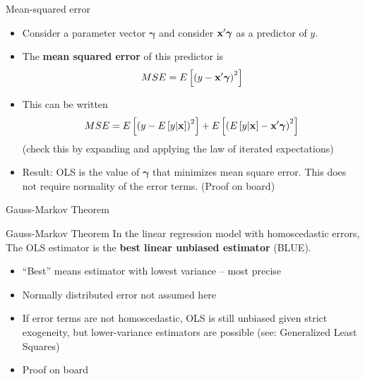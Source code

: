 \documentclass[english,xcolor={dvipsnames},aspectratio=169]{beamer}
\begin{document}
\begin{frame}{Mean-squared error}
\begin{itemize}
	\item Consider a parameter vector $\boldsymbol{\gamma}$ and consider
	${\bf x}'\boldsymbol{\gamma}$ as a predictor of $y$. 

	\medskip
	\item The {\bf mean squared error} of this predictor is\[
	MSE = E\left[\left( y - {\bf x}' \boldsymbol{\gamma}\right)^{2}\right]
	\]

	\item This can be written\[
	MSE = E\left[ \left(y - E\left[y | {\bf x}\right]\right)^{2}\right] + E\left[  \left(E\left[y | {\bf x}\right]- {\bf x}' \boldsymbol{\gamma}\right)^{2} \right]
	\]
	(check this by expanding and applying the law of iterated expectations)

	\item Result: OLS is the value of $\boldsymbol{\gamma}$ that minimizes mean square error. This does not
	require normality of the error terms. (Proof on board)
	
\end{itemize}
\end{frame}


\begin{frame}{Gauss-Markov Theorem}

\begin{block}{Gauss-Markov Theorem}
In the linear regression model with homoscedastic errors, The OLS estimator 
is the {\bf best linear unbiased estimator} (BLUE).
\end{block}

\begin{itemize}
	\item ``Best'' means estimator with lowest variance -- most precise

	\item Normally distributed error not assumed here

	\item If error terms are not homoscedastic, OLS is still unbiased given strict
	exogeneity, but lower-variance estimators are possible (see: Generalized Least Squares)

	\item Proof on board
	
\end{itemize}
\end{frame}
\end{document}
